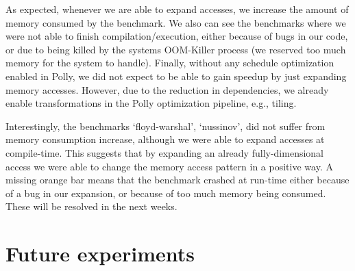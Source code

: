
As expected, whenever we are able to expand accesses, we increase the amount of memory consumed by the benchmark. We also can see the benchmarks where we were not able to finish compilation/execution, either because of bugs in our code, or due to being killed by the systems OOM-Killer process (we reserved too much memory for the system to handle). Finally, without any schedule optimization enabled in Polly, we did not expect to be able to gain speedup by just expanding memory accesses. However, due to the reduction in dependencies, we already enable transformations in the Polly optimization pipeline, e.g., tiling.


Interestingly, the benchmarks ‘floyd-warshal’, ‘nussinov’, did not suffer from memory consumption increase, although we were able to expand accesses at compile-time. This suggests that by expanding an already fully-dimensional access we were able to change the memory access pattern in a positive way. A missing orange bar means that the benchmark crashed at run-time either because of a bug in our expansion, or because of too much memory being consumed. These will be resolved in the next weeks.

\section{Future experiments}
